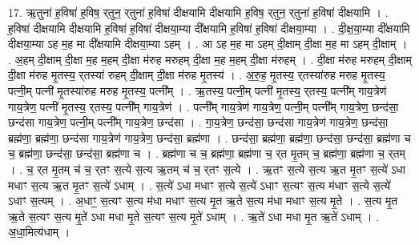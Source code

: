 \documentclass[17pt]{extarticle}
\begin{document}
17. ऋ॒तुना॑ ह॒विषा॑ ह॒विष॒ र्‌तुन॒ र्‌तुना॑ ह॒विषा॑ दीक्षयामि दीक्षयामि ह॒विष॒ र्‌तुन॒ र्‌तुना॑ ह॒विषा॑ दीक्षयामि । . ह॒विषा॑ दीक्षयामि दीक्षयामि ह॒विषा॑ ह॒विषा॑ दीक्षया॒म्या दी᳚क्षयामि ह॒विषा॑ ह॒विषा॑ दीक्षया॒म्या । . दी॒क्ष॒या॒म्या दी᳚क्षयामि दीक्षया॒म्या ऽह म॒ह मा दी᳚क्षयामि दीक्षया॒म्या ऽहम् । . आ ऽह म॒ह मा ऽहम् दी॒क्षाम् दी॒क्षा म॒ह मा ऽहम् दी॒क्षाम् । . अ॒हम् दी॒क्षाम् दी॒क्षा म॒ह म॒हम् दी॒क्षा म॑रुह मरुहम् दी॒क्षा म॒ह म॒हम् दी॒क्षा म॑रुहम् । . दी॒क्षा म॑रुह मरुहम् दी॒क्षाम् दी॒क्षा म॑रुह मृ॒तस्य॒ र्‌तस्या॑ रुहम् दी॒क्षाम् दी॒क्षा म॑रुह मृ॒तस्य॑ । . अ॒रु॒ह॒ मृ॒तस्य॒ र्‌तस्या॑रुह मरुह मृ॒तस्य॒ पत्नी॒म् पत्नी॑ मृ॒तस्या॑रुह मरुह मृ॒तस्य॒ पत्नी᳚म् । . ऋ॒तस्य॒ पत्नी॒म् पत्नी॑ मृ॒तस्य॒ र्‌तस्य॒ पत्नी᳚म् गाय॒त्रेण॑ गाय॒त्रेण॒ पत्नी॑ मृ॒तस्य॒ र्‌तस्य॒ पत्नी᳚म् गाय॒त्रेण॑ । . पत्नी᳚म् गाय॒त्रेण॑ गाय॒त्रेण॒ पत्नी॒म् पत्नी᳚म् गाय॒त्रेण॒ छन्द॑सा॒ छन्द॑सा गाय॒त्रेण॒ पत्नी॒म् पत्नी᳚म् गाय॒त्रेण॒ छन्द॑सा । . गा॒य॒त्रेण॒ छन्द॑सा॒ छन्द॑सा गाय॒त्रेण॑ गाय॒त्रेण॒ छन्द॑सा॒ ब्रह्म॑णा॒ ब्रह्म॑णा॒ छन्द॑सा गाय॒त्रेण॑ गाय॒त्रेण॒ छन्द॑सा॒ ब्रह्म॑णा । . छन्द॑सा॒ ब्रह्म॑णा॒ ब्रह्म॑णा॒ छन्द॑सा॒ छन्द॑सा॒ ब्रह्म॑णा च च॒ ब्रह्म॑णा॒ छन्द॑सा॒ छन्द॑सा॒ ब्रह्म॑णा च । . ब्रह्म॑णा च च॒ ब्रह्म॑णा॒ ब्रह्म॑णा च॒ र्‌त मृ॒तम् च॒ ब्रह्म॑णा॒ ब्रह्म॑णा च॒ र्‌तम् । . च॒ र्‌त मृ॒तम् च॑ च॒ र्‌तꣳ स॒त्ये स॒त्य ऋ॒तम् च॑ च॒ र्‌तꣳ स॒त्ये । . ऋ॒तꣳ स॒त्ये स॒त्य ऋ॒त मृ॒तꣳ स॒त्ये॑ ऽधा मधाꣳ स॒त्य ऋ॒त मृ॒तꣳ स॒त्ये॑ ऽधाम् । . स॒त्ये॑ ऽधा मधाꣳ स॒त्ये स॒त्ये॑ ऽधाꣳ स॒त्यꣳ स॒त्य म॑धाꣳ स॒त्ये स॒त्ये॑ ऽधाꣳ स॒त्यम् । . अ॒धाꣳ॒॒ स॒त्यꣳ स॒त्य म॑धा मधाꣳ स॒त्य मृ॒त ऋ॒ते स॒त्य म॑धा मधाꣳ स॒त्य मृ॒ते । . स॒त्य मृ॒त ऋ॒ते स॒त्यꣳ स॒त्य मृ॒ते॑ ऽधा मधा मृ॒ते स॒त्यꣳ स॒त्य मृ॒ते॑ ऽधाम् । . ऋ॒ते॑ ऽधा मधा मृ॒त ऋ॒ते॑ ऽधाम् । . अ॒धा॒मित्य॑धाम् । \newline
\end{document}
